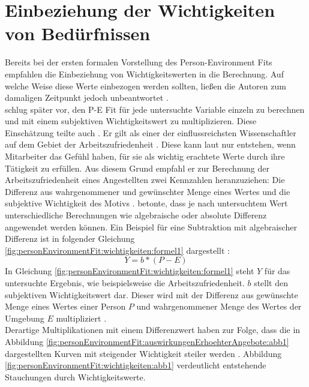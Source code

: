 \section{Einbeziehung der Wichtigkeiten von Bedürfnissen}
\label{ch:personEnvironmentFit:wichtigkeiten}
Bereits bei der ersten formalen Vorstellung des Person-Environment Fits empfahlen \textcite{copingAndAdaption:1974} die Einbeziehung von Wichtigkeitswerten in die Berechnung. Auf welche Weise diese Werte einbezogen werden sollten, ließen die Autoren zum damaligen Zeitpunkt jedoch unbeantwortet \cite[S. 19]{edwards:2008}.\\
\textcite[S. 38]{harrison:1985} schlug später vor, den P-E Fit für jede untersuchte Variable einzeln zu berechnen und mit einem subjektiven Wichtigkeitswert zu multiplizieren. Diese Einschätzung teilte auch \textcite[S. 18]{locke:1969}\cite[S. 8f.]{locke:1976}. Er gilt als einer der einflussreichsten Wissenschaftler auf dem Gebiet der Arbeitszufriedenheit \cite[S. 12]{edwards:2008}. Diese kann laut \textcite[S. 8]{locke:1969} nur entstehen, wenn Mitarbeiter das Gefühl haben, für sie als wichtig erachtete Werte durch ihre Tätigkeit zu erfüllen. Aus diesem Grund empfahl er zur Berechnung der Arbeitszufriedenheit eines Angestellten zwei Kennzahlen heranzuziehen: Die Differenz aus wahrgenommener und gewünschter Menge eines Wertes und die subjektive Wichtigkeit des Motivs \cite[S. 8]{locke:1976}. \textcite[S. 16]{locke:1969} betonte, dass je nach untersuchtem Wert unterschiedliche Berechnungen wie algebraische oder absolute Differenz angewendet werden können. Ein Beispiel für eine Subtraktion mit algebraischer Differenz ist in folgender Gleichung \ref{fig:personEnvironmentFit:wichtigkeiten:formel1} dargestellt \cite[S. 9]{edwards:1990}:
\begin{equation}
	Y = b * (P - E)
	\label{fig:personEnvironmentFit:wichtigkeiten:formel1}
\end{equation}
In Gleichung \ref{fig:personEnvironmentFit:wichtigkeiten:formel1} steht $Y$ für das untersuchte Ergebnis, wie beispielsweise die Arbeitszufriedenheit. $b$ stellt den subjektiven Wichtigkeitswert dar. Dieser wird mit der Differenz aus gewünschte Menge eines Wertes einer Person $P$ und wahrgenommener Menge des Wertes der Umgebung $E$ multipliziert \cite[S. 9f.]{edwards:1990}.\\
Derartige Multiplikationen mit einem Differenzwert haben zur Folge, dass die in Abbildung \ref{fig:personEnvironmentFit:auswirkungenErhoehterAngebote:abb1} dargestellten Kurven mit steigender Wichtigkeit steiler werden \cite[S. 9]{locke:1976}. Abbildung \ref{fig:personEnvironmentFit:wichtigkeiten:abb1} verdeutlicht entstehende Stauchungen durch Wichtigkeitswerte.\\
